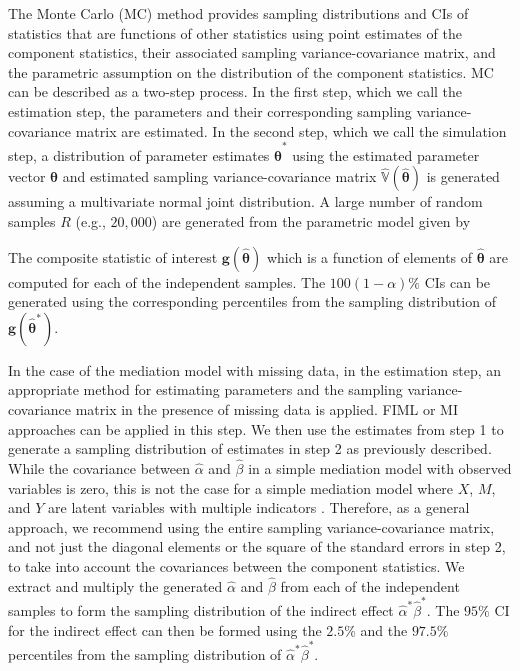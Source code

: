 \documentclass[man]{apa7}\usepackage[]{graphicx}\usepackage[]{xcolor}
\begin{document}
The Monte Carlo (MC) method provides sampling distributions and CIs
of statistics that are functions of other statistics
using point estimates of the component statistics,
their associated sampling variance-covariance matrix,
and the parametric assumption on the distribution of the component statistics.
MC can be described as a two-step process.
In the first step,
which we call the estimation step,
the parameters and their corresponding sampling variance-covariance matrix
are estimated.
In the second step,
which we call the simulation step,
a distribution of parameter estimates
$\hat{\boldsymbol{\theta}}^{\ast}$
using the estimated parameter vector
$\hat{\boldsymbol{\theta}}$
and estimated sampling variance-covariance matrix
$\hat{\mathbb{V}} \left( \hat{\boldsymbol{\theta}} \right)$
is generated assuming a multivariate normal joint distribution.
A large number of random samples $R$ (e.g., $20,000$)
are generated from the parametric model given by



\noindent The composite statistic of interest 
$\mathbf{g} \left( \hat{\boldsymbol{\theta}} \right)$
which is a function of elements of
$\hat{\boldsymbol{\theta}}$
are computed for each of the independent samples.
The $100 \left( 1 - \alpha \right) \%$ CIs can be generated
using the corresponding percentiles
from the sampling distribution of
$\mathbf{g} \left( \hat{\boldsymbol{\theta}}^{\ast} \right)$.

In the case of the mediation model with missing data,
in the estimation step,
an appropriate method for estimating parameters and
the sampling variance-covariance matrix
in the presence of missing data is applied.
FIML or MI approaches can be applied in this step.
We then use the estimates from step 1
to generate a sampling distribution of estimates in step 2
as previously described.
While the covariance between
$\hat{\alpha}$
and
$\hat{\beta}$
in a simple mediation model with observed variables is zero,
this is not the case for a simple mediation model where
$X$,
$M$,
and
$Y$
are latent variables with multiple indicators
\parencite{Lib-Mediation-Books-MacKinnon-2008}.
Therefore,
as a general approach,
we recommend using the entire sampling variance-covariance matrix,
and not just the diagonal elements
or the square of the standard errors in step 2,
to take into account the covariances between the component statistics.
We extract and multiply the generated
$\hat{\alpha}$
and
$\hat{\beta}$
from each of the independent samples
to form the sampling distribution of the indirect effect
${\hat{\alpha}}^{\ast}{\hat{\beta}}^{\ast}$. 
The $95\%$ CI for the indirect effect
can then be formed using the $2.5\%$ and the $97.5\%$ percentiles
from the sampling distribution of
${\hat{\alpha}}^{\ast}{\hat{\beta}}^{\ast}$.
\end{document}
